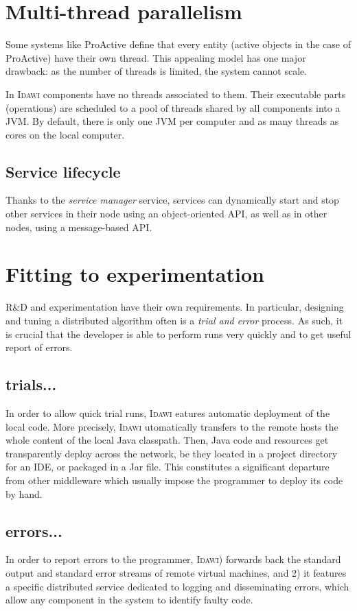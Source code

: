 \documentclass{article}
\newcommand{\idawi}[1]{\textsc{Idawi}\xspace}
\begin{document}
\section{Multi-thread parallelism}
Some systems like ProActive define that every entity (active objects in the case of ProActive) have their own thread. This appealing model has one major drawback: as the number of threads is limited, the system cannot scale.

In \idawi, components have no threads associated to them. Their executable parts (operations) are scheduled to a pool of threads shared by all components into a JVM. By default, there is only one JVM per computer and as many threads as cores on the local computer.

\subsection{Service lifecycle}

Thanks to the \textit{service manager} service, services can dynamically start and stop other services in their node using an object-oriented API, as well as in other nodes, using a message-based API. 



\section{Fitting to experimentation}
R\&D and experimentation have their own requirements. In particular, designing and tuning a distributed algorithm often is a {\em trial and error} process. As such, it is crucial that the developer is able to perform runs very quickly and to get useful report of errors. 

\subsection{trials...}
In order to allow quick trial runs, \idawi features automatic deployment of the local code.  More precisely, \idawi automatically transfers to the remote hosts the whole content of the local Java classpath. Then, Java code and resources get  transparently deploy across the network, be they located in a project directory for an IDE, or packaged in a Jar file. This constitutes a significant departure from other middleware which usually impose the programmer to deploy its code by hand. 

\subsection{errors...}
In order to report errors to the programmer, \idawi 1) forwards back the standard output and standard error streams of remote virtual machines, and 2) it features a specific distributed service dedicated to logging and disseminating errors, which allow any component in the system to identify faulty code.
\end{document}
